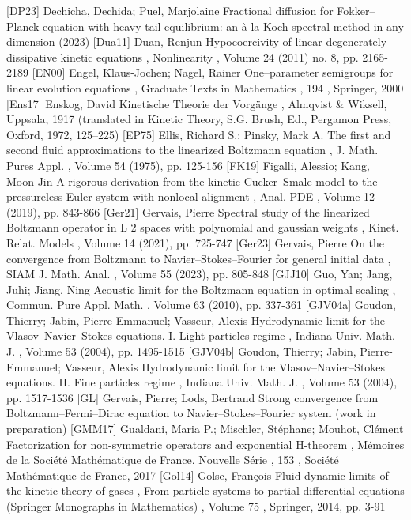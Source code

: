  [DP23] Dechicha, Dechida; Puel, Marjolaine Fractional diffusion for Fokker–Planck equation with heavy tail equilibrium: an à la Koch spectral method in any dimension (2023)
 [Dua11] Duan, Renjun Hypocoercivity of linear degenerately dissipative kinetic equations , Nonlinearity , Volume 24 (2011) no. 8, pp. 2165-2189
 [EN00] Engel, Klaus-Jochen; Nagel, Rainer One–parameter semigroups for linear evolution equations , Graduate Texts in Mathematics , 194 , Springer, 2000
 [Ens17] Enskog, David Kinetische Theorie der Vorgänge , Almqvist \& Wiksell, Uppsala, 1917 (translated in Kinetic Theory, S.G. Brush, Ed., Pergamon Press, Oxford, 1972, 125–225)
 [EP75] Ellis, Richard S.; Pinsky, Mark A. The first and second fluid approximations to the linearized Boltzmann equation , J. Math. Pures Appl. , Volume 54 (1975), pp. 125-156
 [FK19] Figalli, Alessio; Kang, Moon-Jin A rigorous derivation from the kinetic Cucker–Smale model to the pressureless Euler system with nonlocal alignment , Anal. PDE , Volume 12 (2019), pp. 843-866
 [Ger21] Gervais, Pierre Spectral study of the linearized Boltzmann operator in L 2 spaces with polynomial and gaussian weights , Kinet. Relat. Models , Volume 14 (2021), pp. 725-747
 [Ger23] Gervais, Pierre On the convergence from Boltzmann to Navier–Stokes–Fourier for general initial data , SIAM J. Math. Anal. , Volume 55 (2023), pp. 805-848
 [GJJ10] Guo, Yan; Jang, Juhi; Jiang, Ning Acoustic limit for the Boltzmann equation in optimal scaling , Commun. Pure Appl. Math. , Volume 63 (2010), pp. 337-361
 [GJV04a] Goudon, Thierry; Jabin, Pierre-Emmanuel; Vasseur, Alexis Hydrodynamic limit for the Vlasov–Navier–Stokes equations. I. Light particles regime , Indiana Univ. Math. J. , Volume 53 (2004), pp. 1495-1515
 [GJV04b] Goudon, Thierry; Jabin, Pierre-Emmanuel; Vasseur, Alexis Hydrodynamic limit for the Vlasov–Navier–Stokes equations. II. Fine particles regime , Indiana Univ. Math. J. , Volume 53 (2004), pp. 1517-1536
 [GL] Gervais, Pierre; Lods, Bertrand Strong convergence from Boltzmann–Fermi–Dirac equation to Navier–Stokes–Fourier system (work in preparation)
 [GMM17] Gualdani, Maria P.; Mischler, Stéphane; Mouhot, Clément Factorization for non-symmetric operators and exponential H-theorem , Mémoires de la Société Mathématique de France. Nouvelle Série , 153 , Société Mathématique de France, 2017
 [Gol14] Golse, François Fluid dynamic limits of the kinetic theory of gases , From particle systems to partial differential equations (Springer Monographs in Mathematics) , Volume 75 , Springer, 2014, pp. 3-91
